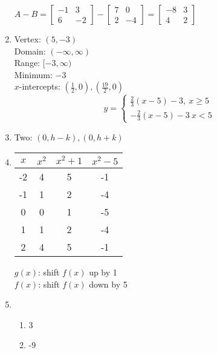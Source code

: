 \documentclass{article}
\begin{document}
\begin{enumerate}
	$A - B =
	\begin{bmatrix}
	-1 & 3 \\
	6 & -2
	\end{bmatrix} -
	\begin{bmatrix}
	7 & 0 \\
	2 & -4
	\end{bmatrix} =
	\begin{bmatrix}
	-8 & 3 \\
	4 & 2
	\end{bmatrix}$
	
\item Vertex: $(5, -3)$ \\
	Domain: $(-\infty, \infty)$ \\
	Range: $[-3, \infty)$ \\
	Minimum: $-3$ \\
	$x$-intercepts: $(\frac{1}{2}, 0), (\frac{19}{2}, 0)$ \\
	
	\begin{equation*}
	y = \begin{cases}
	\frac{2}{3} (x - 5) - 3, \ x \geq 5 \\
	-\frac{2}{3} (x - 5) - 3 \ x < 5
	\end{cases}
	\end{equation*}
	
\item Two: $(0, h-k), (0, h + k)$

\item 
	\begin{tabular}{c | c | c | c}
	$x$ & $x^2$ & $x^2 + 1$ & $x^2 - 5$ \\
	\hline
	-2 & 4 & 5 & -1 \\
	-1 & 1 & 2 & -4 \\
	0 & 0 & 1 & -5 \\
	1 & 1 & 2 & -4 \\
	2 & 4 & 5 & -1
	\end{tabular}
	
	$g(x)$: shift $f(x)$ up by 1 \\
	$f(x)$: shift $f(x)$ down by 5
	
\item
	\begin{enumerate}
	
	\item 3
	
	\item -9
	
	\end{enumerate}
	
\end{enumerate}
\end{document}
